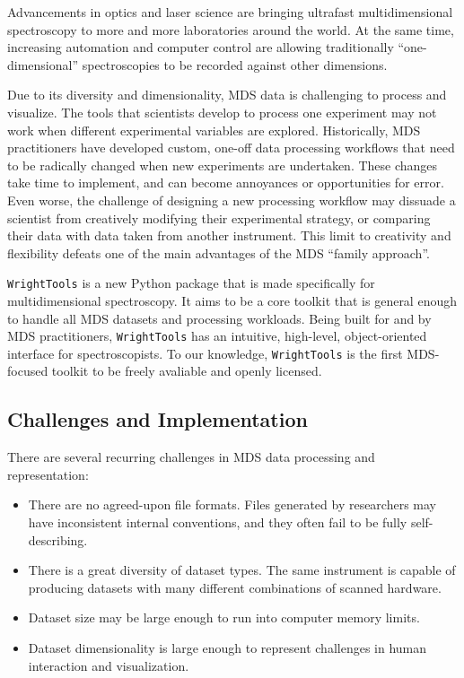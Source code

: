 Advancements in optics and laser science are bringing ultrafast
multidimensional spectroscopy to more and more laboratories around the
world. At the same time, increasing automation and computer control are
allowing traditionally ``one-dimensional'' spectroscopies to be recorded
against other dimensions.

Due to its diversity and dimensionality, MDS data is challenging to
process and visualize. The tools that scientists develop to process one
experiment may not work when different experimental variables are
explored. Historically, MDS practitioners have developed custom, one-off
data processing workflows that need to be radically changed when new
experiments are undertaken. These changes take time to implement, and
can become annoyances or opportunities for error. Even worse, the
challenge of designing a new processing workflow may dissuade a
scientist from creatively modifying their experimental strategy, or
comparing their data with data taken from another instrument. This limit
to creativity and flexibility defeats one of the main advantages of the
MDS ``family approach''.

\texttt{WrightTools} is a new Python package that is made specifically
for multidimensional spectroscopy. It aims to be a core toolkit that is
general enough to handle all MDS datasets and processing workloads.
Being built for and by MDS practitioners, \texttt{WrightTools} has an
intuitive, high-level, object-oriented interface for spectroscopists. To
our knowledge, \texttt{WrightTools} is the first MDS-focused toolkit to
be freely avaliable and openly licensed.

\hypertarget{challenges-and-implementation}{%
\subsection{Challenges and
Implementation}\label{challenges-and-implementation}}

There are several recurring challenges in MDS data processing and
representation:

\begin{itemize}
\tightlist
\item
  There are no agreed-upon file formats. Files generated by researchers
  may have inconsistent internal conventions, and they often fail to be
  fully self-describing.
\item
  There is a great diversity of dataset types. The same instrument is
  capable of producing datasets with many different combinations of
  scanned hardware.
\item
  Dataset size may be large enough to run into computer memory limits.
\item
  Dataset dimensionality is large enough to represent challenges in
  human interaction and visualization.
\end{itemize}

